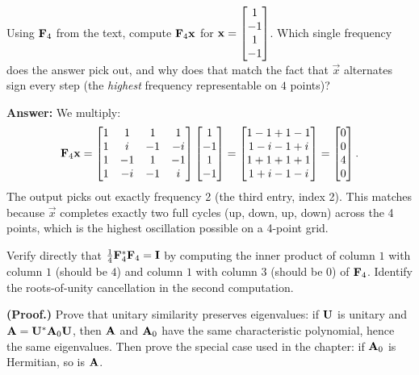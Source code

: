 \begin{exercise}\label{ch32:ex-f4}
Using $\mathbf{F}_4$ from the text, compute $\mathbf{F}_4\mathbf{x}$ for
$\mathbf{x}=\begin{bmatrix}1\\-1\\1\\-1\end{bmatrix}$. Which single frequency does the answer pick out, and
why does that match the fact that $\vec x$ alternates sign every step (the
\emph{highest} frequency representable on $4$ points)?

\textbf{Answer:} We multiply:
\[
  \mathbf{F}_4 \mathbf{x} = \begin{bmatrix}
    1 & 1 & 1 & 1 \\
    1 & i & -1 & -i \\
    1 & -1 & 1 & -1 \\
    1 & -i & -1 & i
  \end{bmatrix} \begin{bmatrix}1 \\ -1 \\ 1 \\ -1\end{bmatrix} = \begin{bmatrix}1 - 1 + 1 - 1 \\ 1 - i - 1 + i \\ 1 + 1 + 1 + 1 \\ 1 + i - 1 - i\end{bmatrix} = \begin{bmatrix}0 \\ 0 \\ 4 \\ 0\end{bmatrix}.
\]
The output picks out exactly frequency 2 (the third entry, index 2). This matches because $\vec x$ completes exactly two full cycles (up, down, up, down) across the 4 points, which is the highest oscillation possible on a 4-point grid.
\end{exercise}

\begin{exercise}\label{ch32:ex-f4unitary}
Verify directly that $\tfrac14\mathbf{F}_4^{*}\mathbf{F}_4=\mathbf{I}$ by computing the inner
product of column $1$ with column $1$ (should be $4$) and column $1$ with column $3$
(should be $0$) of $\mathbf{F}_4$. Identify the roots-of-unity cancellation in the
second computation.
\end{exercise}

\begin{exercise}\label{ch32:ex-unitarysim}
\textbf{(Proof.)} Prove that unitary similarity preserves eigenvalues: if $\mathbf{U}$
is unitary and $\mathbf{A}=\mathbf{U}^{*}\mathbf{A}_0\mathbf{U}$, then $\mathbf{A}$ and $\mathbf{A}_0$ have
the same characteristic polynomial, hence the same eigenvalues. Then prove the
special case used in the chapter: if $\mathbf{A}_0$ is Hermitian, so is $\mathbf{A}$.
\end{exercise}

